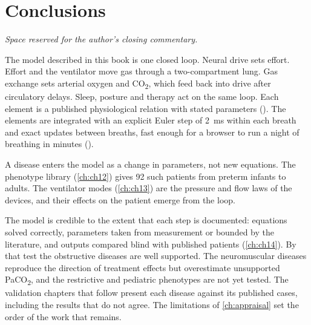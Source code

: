 \chapter{Conclusions}
\label{ch:concl}

\begin{authornote}
\emph{Space reserved for the author's closing commentary.}
\end{authornote}

The model described in this book is one closed loop. Neural drive sets effort. Effort and the ventilator move gas through a two-compartment lung. Gas exchange sets arterial oxygen and CO\textsubscript{2}, which feed back into drive after circulatory delays. Sleep, posture and therapy act on the same loop. Each element is a published physiological relation with stated parameters (). The elements are integrated with an explicit Euler step of \SI{2}{\milli\second} within each breath and exact updates between breaths, fast enough for a browser to run a night of breathing in minutes ().

A disease enters the model as a change in parameters, not new equations. The phenotype library (\cref{ch:ch12}) gives 92 such patients from preterm infants to adults. The ventilator modes (\cref{ch:ch13}) are the pressure and flow laws of the devices, and their effects on the patient emerge from the loop.

The model is credible to the extent that each step is documented: equations solved correctly, parameters taken from measurement or bounded by the literature, and outputs compared blind with published patients (\cref{ch:ch14}). By that test the obstructive diseases are well supported. The neuromuscular diseases reproduce the direction of treatment effects but overestimate unsupported PaCO\textsubscript{2}, and the restrictive and pediatric phenotypes are not yet tested. The validation chapters that follow present each disease against its published cases, including the results that do not agree. The limitations of \cref{ch:appraisal} set the order of the work that remains.
